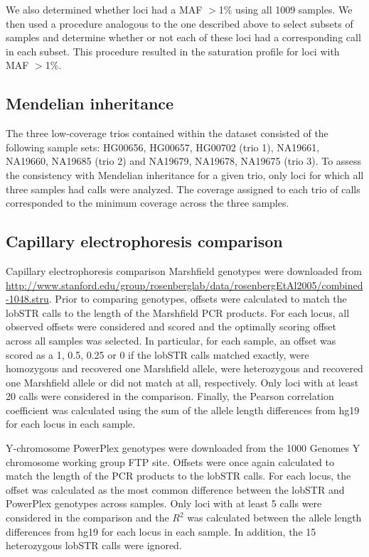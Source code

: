We also determined whether loci had a MAF $>$1\% using all 1009 samples. We then used a procedure analogous to the one described above to select subsets of samples and determine whether or not each of these loci had a corresponding call in each subset. This procedure resulted in the saturation profile for loci with MAF $>$1\%. 

\subsection{Mendelian inheritance}
The three low-coverage trios contained within the dataset consisted of the following sample sets: HG00656, HG00657, HG00702 (trio 1), NA19661, NA19660, NA19685 (trio 2) and NA19679, NA19678, NA19675 (trio 3). To assess the consistency with Mendelian inheritance for a given trio, only loci for which all three samples had calls were analyzed. The coverage assigned to each trio of calls corresponded to the minimum coverage across the three samples. 

\subsection{Capillary electrophoresis comparison}
Capillary electrophoresis comparison Marshfield genotypes \cite{Rosenberg2006} were downloaded from \url{http://www.stanford.edu/group/rosenberglab/data/rosenbergEtAl2005/combined-1048.stru}. Prior to comparing genotypes, offsets were calculated to match the lobSTR calls to the length of the Marshfield PCR products. For each locus, all observed offsets were considered and scored and the optimally scoring offset across all samples was selected. In particular, for each sample, an offset was scored as a 1, 0.5, 0.25 or 0 if the lobSTR calls matched exactly, were homozygous and recovered one Marshfield allele, were heterozygous and recovered one Marshfield allele or did not match at all, respectively.  Only loci with at least 20 calls were considered in the comparison. Finally, the Pearson correlation coefficient was calculated using the sum of the allele length differences from hg19 for each locus in each sample.

Y-chromosome PowerPlex genotypes were downloaded from the 1000 Genomes Y chromosome working group FTP site. Offsets were once again calculated to match the length of the PCR products to the lobSTR calls. For each locus, the offset was calculated as the most common difference between the lobSTR and PowerPlex genotypes across samples. Only loci with at least 5 calls were considered in the comparison and the $R^2$ was calculated between the allele length differences from hg19 for each locus in each sample. In addition, the 15 heterozygous lobSTR calls were ignored.  

